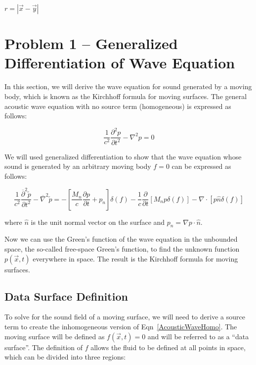 \documentclass[]{aiaa-tc}%
\begin{document}
$r=|\vec{x} - \vec{y}|$


\section{Problem 1 -- Generalized Differentiation of Wave Equation} \label{SecGenDiff}

In this section, we will derive the wave equation for sound generated by a moving body, which is known as the Kirchhoff formula for moving surfaces.  The general acoustic wave equation with no source term (homogeneous) is expressed as follows:

\begin{equation} \label{AcousticWaveHomo}
\boxed{\dfrac{1}{c^2}\dfrac{\partial^2p}{\partial t^2} - \nabla^2p = 0}
\end{equation}

We will used generalized differentiation to show that the wave equation whose sound is generated by an arbitrary moving body $f=0$ can be expressed as follows:

\begin{equation} \label{AcousticWaveBody}
\boxed{\dfrac{1}{c^2}\dfrac{ \overline{\partial}^2\widetilde{p}}{\partial t^2}
    - \overline{\nabla}^2 \widetilde{p}
= -\left[ \dfrac{M_n}{c} \dfrac{\partial p}{\partial t} + p_n \right] \delta(f)
    -\dfrac{1}{c} \dfrac{\partial}{\partial t} \left[ M_n p \delta(f) \right]
    -\nabla \cdot \left[ p \hat{n} \delta(f) \right]}
\end{equation}

\noindent where $\hat{n}$ is the unit normal vector on the surface and $p_n = \nabla p \cdot \hat{n}$.

Now we can use the Green’s function of the wave equation in the unbounded space, the so-called free-space Green’s function, to find the unknown function $p(\vec{x},t)$   everywhere in space. The result is the Kirchhoff formula for moving surfaces.


\subsection{Data Surface Definition}

To solve for the sound field of a moving surface, we will need to derive a source term to create the inhomogeneous version of Eqn~\ref{AcousticWaveHomo}.  The moving surface will be defined as $f(\vec{x},t) = 0$ and will be referred to as a ``data surface''.  The definition of $f$ allows the fluid to be defined at all points in space, which can be divided into three regions:
\end{document}
